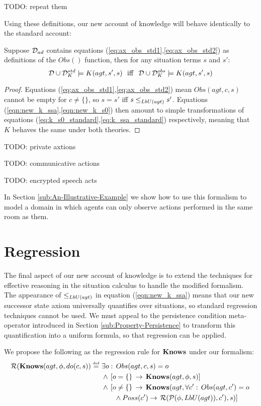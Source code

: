 TODO: repeat them

Using these definitions, our new account of knowledge will behave
identically to the standard account:

\begin{thm}
Suppose $\mathcal{D}_{ad}$ contains equations (\ref{eq:ax_obs_std1},\ref{eq:ax_obs_std2})
as definitions of the $Obs()$ function, then for any situation terms
$s$ and $s'$:\[
\mathcal{D}\cup\mathcal{D}_{K}^{std}\models K(agt,s',s)\,\,\,\,\mathrm{iff}\,\,\,\,\mathcal{D}\cup\mathcal{D}_{K}^{obs}\models K(agt,s',s)\]

\end{thm}
\begin{proof}
Equations (\ref{eq:ax_obs_std1},\ref{eq:ax_obs_std2}) mean $Obs(agt,c,s)$
cannot be empty for $c\neq\{\}$, so $s=s'$ iff $s\leq_{LbU(agt)}s'$.
Equations (\ref{eqn:new_k_ssa},\ref{eqn:new_k_s0}) then amount to
simple transformations of equations (\ref{eq:k_s0_standard},\ref{eq:k_ssa_standard})
respectively, meaning that $K$ behaves the same under both theories. 
\end{proof}
TODO: private axtions

TODO: communicative actions

TODO: encrypted speech acts

In Section \ref{sub:An-Illustrative-Example} we show how to use this
formalism to model a domain in which agents can only observe actions
performed in the same room as them.


\section{Regression}

The final aspect of our new account of knowledge is to extend the
techniques for effective reasoning in the situation calculus to handle
the modified formalism. The appearance of $\leq_{LbU(agt)}$ in equation
(\ref{eqn:new_k_ssa}) means that our new successor state axiom universally
quantifies over situations, so standard regression techniques cannot
be used. We must appeal to the persistence condition meta-operator
introduced in Section \ref{sub:Property-Persistence} to transform
this quantification into a uniform formula, so that regression can
be applied.

We propose the following as the regression rule for $\mathbf{Knows}$ under
our formalism:\begin{align}
\mathcal{R}(\mathbf{Knows}(agt,\phi,do(c,s))\stackrel{\mbox{\tiny def}}{=}\,\, & \exists o:\, Obs(agt,c,s)=o\nonumber \\
 & \wedge\,\left[o=\{\}\,\rightarrow\,\mathbf{Knows}(agt,\phi,s)\right]\nonumber \\
 & \wedge\,\left[o\neq\{\}\,\rightarrow\,\mathbf{Knows}(agt,\forall c':\, Obs(agt,c')=o\right.\nonumber \\
 & \,\,\,\,\,\,\,\,\,\,\,\wedge Poss(c')\rightarrow\left.\mathcal{R}(\mathcal{P}(\phi,LbU(agt)),c'),s)\right]\label{eqn:R_do_c_s}\end{align}


